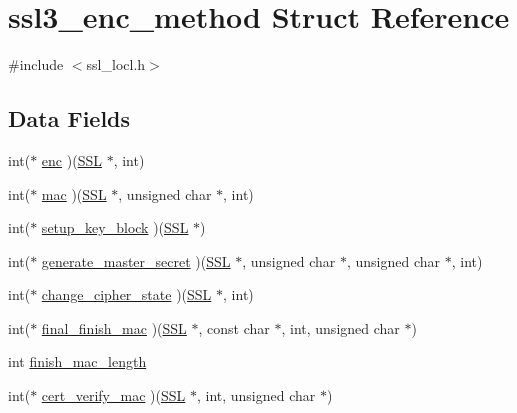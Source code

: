 \hypertarget{structssl3__enc__method}{}\section{ssl3\+\_\+enc\+\_\+method Struct Reference}
\label{structssl3__enc__method}


{\ttfamily \#include $<$ssl\+\_\+locl.\+h$>$}

\subsection*{Data Fields}
\begin{DoxyCompactItemize}
\item 
int($\ast$ \hyperlink{structssl3__enc__method_a211260092271d3b9944de5ca37227cbe}{enc} )(\hyperlink{crypto_2ossl__typ_8h_a71f21e09bf365489dab9d85bd4785e24}{S\+SL} $\ast$, int)
\item 
int($\ast$ \hyperlink{structssl3__enc__method_aea78e60d168a44361a5b79aaa5fcd1ce}{mac} )(\hyperlink{crypto_2ossl__typ_8h_a71f21e09bf365489dab9d85bd4785e24}{S\+SL} $\ast$, unsigned char $\ast$, int)
\item 
int($\ast$ \hyperlink{structssl3__enc__method_a7ce6b62bbedb7f02398ff688f930d802}{setup\+\_\+key\+\_\+block} )(\hyperlink{crypto_2ossl__typ_8h_a71f21e09bf365489dab9d85bd4785e24}{S\+SL} $\ast$)
\item 
int($\ast$ \hyperlink{structssl3__enc__method_ae3fc4648a5b6b9b630c8ce6b8662d934}{generate\+\_\+master\+\_\+secret} )(\hyperlink{crypto_2ossl__typ_8h_a71f21e09bf365489dab9d85bd4785e24}{S\+SL} $\ast$, unsigned char $\ast$, unsigned char $\ast$, int)
\item 
int($\ast$ \hyperlink{structssl3__enc__method_a8e04c20ccfa9133c7f7b2e9fd21cdef3}{change\+\_\+cipher\+\_\+state} )(\hyperlink{crypto_2ossl__typ_8h_a71f21e09bf365489dab9d85bd4785e24}{S\+SL} $\ast$, int)
\item 
int($\ast$ \hyperlink{structssl3__enc__method_a52360202fb30e0ffac336aa3bd9e8737}{final\+\_\+finish\+\_\+mac} )(\hyperlink{crypto_2ossl__typ_8h_a71f21e09bf365489dab9d85bd4785e24}{S\+SL} $\ast$, const char $\ast$, int, unsigned char $\ast$)
\item 
int \hyperlink{structssl3__enc__method_ae19d342ac58a6c75d8ad7b426e36a3ea}{finish\+\_\+mac\+\_\+length}
\item 
int($\ast$ \hyperlink{structssl3__enc__method_a21c24ac84ea68cb0fa96b4fa27026b34}{cert\+\_\+verify\+\_\+mac} )(\hyperlink{crypto_2ossl__typ_8h_a71f21e09bf365489dab9d85bd4785e24}{S\+SL} $\ast$, int, unsigned char $\ast$)

\end{DoxyCompactItemize}

